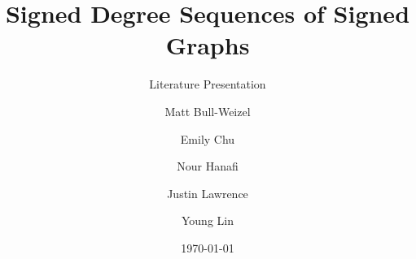 \documentclass{beamer}
\title[Signed Graphs]{Signed Degree Sequences of Signed Graphs}
\subtitle{Literature Presentation}
\author[]{Matt Bull-Weizel \and Emily Chu \and Nour Hanafi \and Justin Lawrence \and Young Lin}
\institute{UBC}
\date{\today}
\begin{document}
\begin{frame}
\titlepage
\end{frame}





\end{document}
